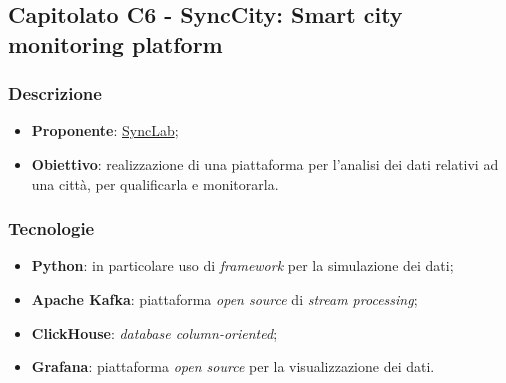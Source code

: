\subsection{Capitolato C6 - SyncCity: Smart city monitoring platform}

\subsubsection{Descrizione}
\begin{itemize}
    \item \textbf{Proponente}: \href{https://www.synclab.it/home}{SyncLab};
    \item \textbf{Obiettivo}: realizzazione di una piattaforma per l'analisi dei dati relativi ad una città, per qualificarla e monitorarla.
\end{itemize}


\subsubsection{Tecnologie}
\begin{itemize}
    \item \textbf{Python}: in particolare uso di \textit{framework} per la simulazione dei dati;
    \item \textbf{Apache Kafka}: piattaforma \textit{open source} di \textit{stream processing};
    \item \textbf{ClickHouse}: \textit{database column-oriented};
    \item \textbf{Grafana}: piattaforma \textit{open source} per la visualizzazione dei dati.
\end{itemize}


